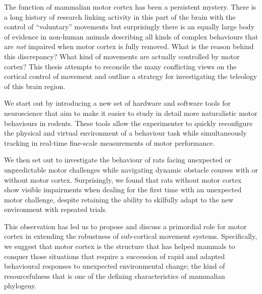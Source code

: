 \label{ch:abstract}

The function of mammalian motor cortex has been a persistent mystery. There is a long history of research linking activity in this part of the brain with the control of ``voluntary'' movements but surprisingly there is an equally large body of evidence in non-human animals describing all kinds of complex behaviours that are \emph{not} impaired when motor cortex is fully removed. What is the reason behind this discrepancy? What kind of movements are actually controlled by motor cortex? This thesis attempts to reconcile the many conflicting views on the cortical control of movement and outline a strategy for investigating the teleology of this brain region.

We start out by introducing a new set of hardware and software tools for neuroscience that aim to make it easier to study in detail more naturalistic motor behaviours in rodents. These tools allow the experimenter to quickly reconfigure the physical and virtual environment of a behaviour task while simultaneously tracking in real-time fine-scale measurements of motor performance.

We then set out to investigate the behaviour of rats facing unexpected or unpredictable motor challenges while navigating dynamic obstacle courses with or without motor cortex. Surprisingly, we found that rats without motor cortex show visible impairments when dealing for the first time with an unexpected motor challenge, despite retaining the ability to skilfully adapt to the new environment with repeated trials.

This observation has led us to propose and discuss a primordial role for motor cortex in extending the robustness of sub-cortical movement systems. Specifically, we suggest that motor cortex is the structure that has helped mammals to conquer those situations that require a succession of rapid and adapted behavioural responses to unexpected environmental change; the kind of resourcefulness that is one of the defining characteristics of mammalian phylogeny.
